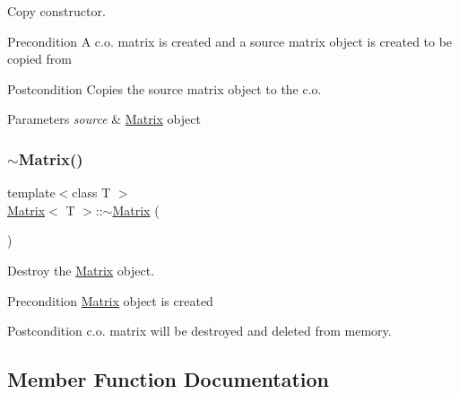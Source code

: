 Copy constructor. 

\begin{DoxyPrecond}{Precondition}
A c.\+o. matrix is created and a source matrix object is created to be copied from 
\end{DoxyPrecond}
\begin{DoxyPostcond}{Postcondition}
Copies the source matrix object to the c.\+o. 
\end{DoxyPostcond}

\begin{DoxyParams}{Parameters}
{\em source} & \mbox{\hyperlink{class_matrix}{Matrix}} object \\
\hline
\end{DoxyParams}
\mbox{\label{class_matrix_a91aa704de674203e96aece9e1955ccd3}} 
\subsubsection{\texorpdfstring{$\sim$Matrix()}{~Matrix()}}
{\footnotesize\ttfamily template$<$class T $>$ \\
\mbox{\hyperlink{class_matrix}{Matrix}}$<$ T $>$\+::$\sim$\mbox{\hyperlink{class_matrix}{Matrix}} (\begin{DoxyParamCaption}{ }\end{DoxyParamCaption})}



Destroy the \mbox{\hyperlink{class_matrix}{Matrix}} object. 

\begin{DoxyPrecond}{Precondition}
\mbox{\hyperlink{class_matrix}{Matrix}} object is created 
\end{DoxyPrecond}
\begin{DoxyPostcond}{Postcondition}
c.\+o. matrix will be destroyed and deleted from memory. 
\end{DoxyPostcond}


\subsection{Member Function Documentation}
\mbox{\label{class_matrix_a427a50c20bb056fd20bdf2740995f8c1}} 

